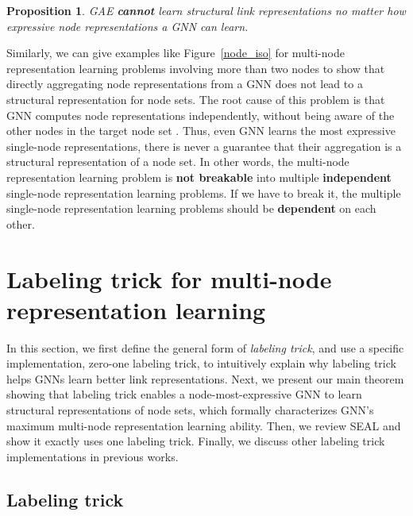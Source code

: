 \documentclass{article}
\newtheorem{proposition}{Proposition}
\begin{document}
\begin{proposition}
GAE \textbf{cannot} learn structural link representations no matter how expressive node representations a GNN can learn.
\end{proposition}

Similarly, we can give examples like Figure~\ref{node_iso} for multi-node representation learning problems involving more than two nodes to show that directly aggregating node representations from a GNN does not lead to a structural representation for node sets. 
The root cause of this problem is that GNN computes node representations independently, without being aware of the other nodes in the target node set . Thus, even GNN learns the most expressive single-node representations, there is never a guarantee that their aggregation is a structural representation of a node set. In other words, the multi-node representation learning problem is \textbf{not breakable} into multiple \textbf{independent} single-node representation learning problems. If we have to break it, the multiple single-node representation learning problems should be \textbf{dependent} on each other.












\section{Labeling trick for multi-node representation learning}


In this section, we first define the general form of \textit{labeling trick}, and use a specific implementation, zero-one labeling trick, to intuitively explain why labeling trick helps GNNs learn better link representations. Next, we present our main theorem showing that labeling trick enables a node-most-expressive GNN to learn structural representations of node sets, which formally characterizes GNN's maximum multi-node representation learning ability. Then, we review SEAL and show it exactly uses one labeling trick. Finally, we discuss other labeling trick implementations in previous works. 










\subsection{Labeling trick}\label{sec:labelingtrick}
\end{document}

